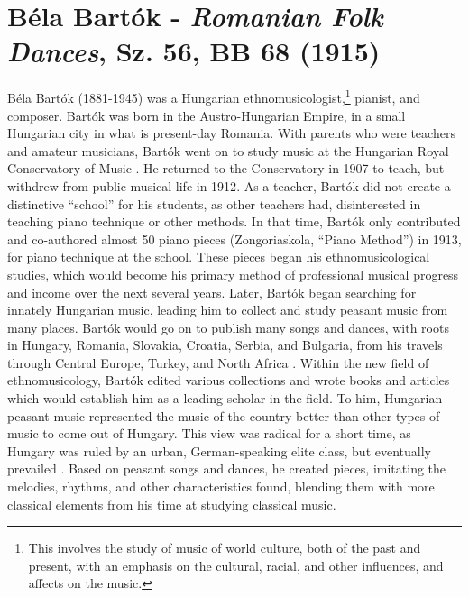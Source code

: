 \chapter[Bartók's \textit{Romanian Folk Dances}, Sz. 56, BB 68]{Béla Bartók - \textit{Romanian Folk Dances}, Sz. 56, BB 68 (1915)}

Béla Bartók (1881-1945) was a Hungarian ethnomusicologist,\footnote{This involves the study of music of world culture, both of the past and present, with an emphasis on the cultural, racial, and other influences, and affects on the music.} pianist, and composer. Bartók was born in the Austro-Hungarian Empire, in a small Hungarian city in what is present-day Romania. With parents who were teachers and amateur musicians, Bartók went on to study music at the Hungarian Royal Conservatory of Music \autocite{Burkholder_Grout_Palisca_2014}. He returned to the Conservatory in 1907 to teach, but withdrew from public musical life in 1912\autocite{Gillies}. As a teacher, Bartók did not create a distinctive ``school'' for his students, as other teachers had, disinterested in teaching piano technique or other methods. In that time, Bartók only contributed and co-authored almost 50 piano pieces (Zongoriaskola, ``Piano Method'') in 1913, for piano technique at the school\autocite{Gillies}. These pieces began his ethnomusicological studies, which would become his primary method of professional musical progress and income over the next several years. Later, Bartók began searching for innately Hungarian music, leading him to collect and study peasant music from many places. Bartók would go on to publish many songs and dances, with roots in Hungary, Romania, Slovakia, Croatia, Serbia, and Bulgaria, from his travels through Central Europe, Turkey, and North Africa \autocite{Burkholder_Grout_Palisca_2014}. Within the new field of ethnomusicology, Bartók edited various collections and wrote books and articles which would establish him as a leading scholar in the field. To him, Hungarian peasant music represented the music of the country better than other types of music to come out of Hungary. This view was radical for a short time, as Hungary was ruled by an urban, German-speaking elite class, but eventually prevailed \autocite{Burkholder_Grout_Palisca_2014}. Based on peasant songs and dances, he created pieces, imitating the melodies, rhythms, and other characteristics found, blending them with more classical elements from his time at studying classical music. 

